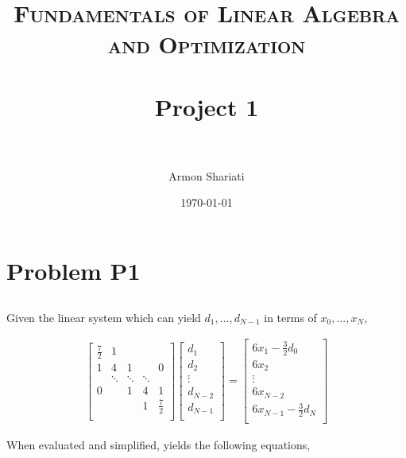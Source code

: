 \documentclass[paper=a4, fontsize=11pt]{scrartcl} %
\title{	
    \normalfont \normalsize 
    \textsc{Fundamentals of Linear Algebra and Optimization} \\ [25pt] %
    \horrule{0.5pt} \\[0.4cm] %
    \huge Project 1 \\ %
    \horrule{2pt} \\[0.5cm] %
}
\author{Armon Shariati} %
\date{\normalsize\today} %
\begin{document}
\maketitle %


\section*{Problem P1}
\setcounter{section}{1}
\setcounter{subsection}{1}

\subsection{}

Given the linear system which can yield $d_{1}, ... , d_{N-1}$ in terms of
$x_{0}, ... , x_{N}$,

\begin{align*}
    \begin{bmatrix}
        \frac{7}{2} & 1 \\
        1 & 4 & 1 & & 0\\
          & \ddots & \ddots & \ddots \\
        0 & & 1 & 4 & 1\\
          & &   & 1 & \frac{7}{2}\\
    \end{bmatrix} \begin{bmatrix}
        d_{1}\\
        d_{2}\\
        \vdots\\
        d_{N-2}\\
        d_{N-1}\\
    \end{bmatrix} = \begin{bmatrix}
        6x_{1} - \frac{3}{2}d_{0}\\
        6x_{2}\\
        \vdots\\
        6x_{N-2}\\
        6x_{N-1} - \frac{3}{2}d_{N}\\
    \end{bmatrix}
\end{align*}

When evaluated and simplified, yields the following equations,
\end{document}
